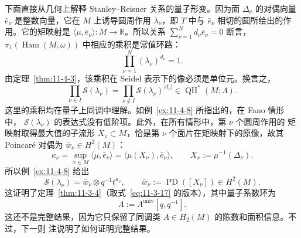 下面直接从几何上解释 Stanley--Reisner 关系的量子形变。因为面 $\Delta_\nu$ 的对偶向量
$\bar e_\nu$ 是整数向量，它在 $M$ 上诱导圆周作用 $\lambda_\nu$，即 $T$ 中与
$\bar e_\nu$ 相切的圆所给出的作用。它的矩映射是
$\langle\mu,\bar e_\nu\rangle:M\to\mathbb R$。所以关系
$\sum_{\nu=1}^N d_\nu\bar e_\nu=0$ 断言，$\pi_1(\operatorname{Ham}(M,\omega))$
中相应的乘积是常值环路：
\[
  \prod_{\nu=1}^N(\lambda_\nu)^{d_\nu}=1.
\]
由定理~\ref{thm:11-4-3}，该乘积在 Seidel 表示下的像必须是单位元。换言之，
\begin{equation}\label{eq:11-4-10}
  \prod_{\nu\in I}\mathcal S(\lambda_\nu)
  =\prod_{\nu\notin I}\mathcal S(\lambda_\nu)^{|d_\nu|}
  \in\operatorname{QH}^*(M;\Lambda).
\end{equation}
这里的乘积均在量子上同调中理解。如例~\ref{ex:11-4-8} 所指出的，在 Fano 情形中，
$\mathcal S(\lambda_\nu)$ 的表达式没有低阶项。此外，在所有情形中，第 $\nu$ 个圆周作用的
矩映射取得最大值的子流形 $X_\nu\subset M$，恰是第 $\nu$ 个面片在矩映射下的原像，故其
Poincar\'e 对偶为 $\bar w_\nu\in H^2(M)$：
\[
  \kappa_\nu=\sup_{x\in M}\langle\mu,\bar e_\nu\rangle
  =\langle\mu(X_\nu),\bar e_\nu\rangle,
  \qquad
  X_\nu:=\mu^{-1}(\Delta_\nu).
\]
所以例~\ref{ex:11-4-8} 给出
\[
  \mathcal S(\lambda_\nu)=\bar w_\nu\otimes q^{-1}t^{\kappa_\nu},
  \qquad
  \bar w_\nu:=\operatorname{PD}([X_\nu])\in H^2(M).
\]
这证明了定理~\ref{thm:11-3-4}（取式~\eqref{eq:11-3-17} 的版本），其中量子系数环为
\[
  \Lambda:=\Lambda^{\mathrm{univ}}[q,q^{-1}].
\]
这还不是完整结果，因为它只保留了同调类 $A\in H_2(M)$ 的陈数和面积信息。不过，下一则
注说明了如何证明完整结果。

